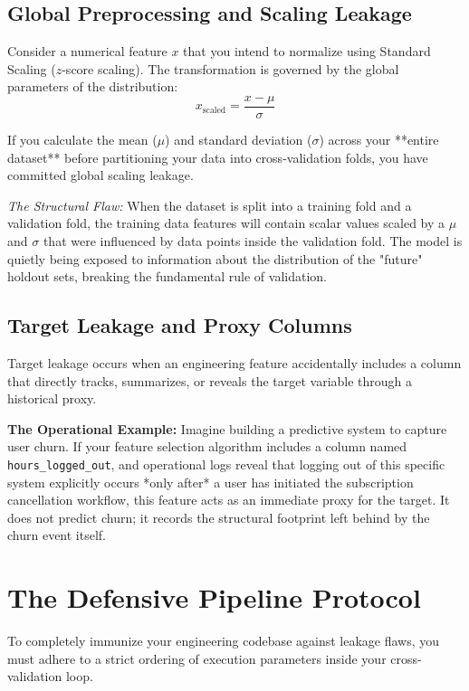 \documentclass{article}
\begin{document}
\subsection{Global Preprocessing and Scaling Leakage}
Consider a numerical feature $x$ that you intend to normalize using Standard Scaling ($z$-score scaling). The transformation is governed by the global parameters of the distribution:
\begin{equation}
    x_{\text{scaled}} = \frac{x - \mu}{\sigma}
\end{equation}

If you calculate the mean ($\mu$) and standard deviation ($\sigma$) across your **entire dataset** before partitioning your data into cross-validation folds, you have committed global scaling leakage.

\textit{The Structural Flaw:} When the dataset is split into a training fold and a validation fold, the training data features will contain scalar values scaled by a $\mu$ and $\sigma$ that were influenced by data points inside the validation fold. The model is quietly being exposed to information about the distribution of the "future" holdout sets, breaking the fundamental rule of validation.

\subsection{Target Leakage and Proxy Columns}
Target leakage occurs when an engineering feature accidentally includes a column that directly tracks, summarizes, or reveals the target variable through a historical proxy.

\textbf{The Operational Example:} Imagine building a predictive system to capture user churn. If your feature selection algorithm includes a column named \texttt{hours\_logged\_out}, and operational logs reveal that logging out of this specific system explicitly occurs *only after* a user has initiated the subscription cancellation workflow, this feature acts as an immediate proxy for the target. It does not predict churn; it records the structural footprint left behind by the churn event itself.

\section{The Defensive Pipeline Protocol}
To completely immunize your engineering codebase against leakage flaws, you must adhere to a strict ordering of execution parameters inside your cross-validation loop.
\end{document}
